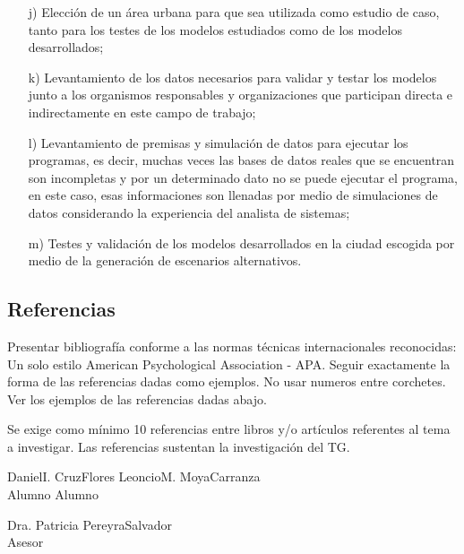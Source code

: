 \documentclass[a4paper, 12pt]{article}
\begin{document}
\begin{enumerate}
\item[j)]	Elección de un área urbana para que sea utilizada como estudio de caso,  tanto para los testes de los modelos estudiados como de los modelos desarrollados;
\item[k)]	Levantamiento de los datos necesarios para validar y testar los modelos junto a los organismos responsables y organizaciones que participan directa e indirectamente en este campo de trabajo;
\item[l)]	Levantamiento de premisas y simulación de datos para ejecutar los programas, es decir, muchas veces las bases de datos reales que se encuentran son incompletas y por un determinado dato no se puede ejecutar el programa, en este caso, esas informaciones son llenadas por medio de simulaciones de datos considerando la experiencia del analista de sistemas;
\item[m)]	Testes y validación de los modelos desarrollados en la ciudad escogida por medio de la generación de escenarios alternativos.    
\end{enumerate}
    



\subsection{Referencias}
Presentar bibliografía conforme a las normas técnicas internacionales reconocidas: Un solo estilo American Psychological Association - APA. Seguir exactamente la forma de las referencias dadas como ejemplos. No usar numeros entre corchetes. Ver los ejemplos de las referencias dadas abajo.\par
\vskip 0.3cm
Se exige como mínimo 10 referencias entre libros y/o artículos referentes al tema a investigar. Las referencias sustentan la investigación del TG.



\vskip 1cm

\hspace{0.7cm}Daniel\hspace{.1cm}I.\hspace{.1cm} Cruz\hspace{.1cm}Flores 
\hspace{4cm}Leoncio\hspace{.1cm}M.\hspace{.1cm} Moya\hspace{.1cm}Carranza \\
\hspace*{2.6cm} Alumno  \hspace*{6.6cm}Alumno


\vskip 1cm
\begin{center}
Dra. \hspace{.1cm}Patricia\hspace{.1cm} Pereyra\hspace{.1cm}Salvador\\
 Asesor
\end{center}
\end{document}
